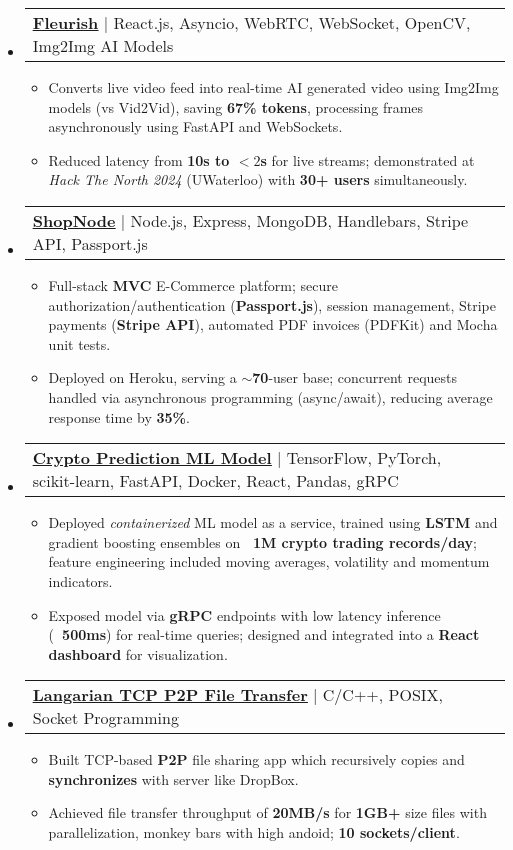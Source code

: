 \documentclass[letterpaper,11pt]{article}
\makeatletter
\newcommand{\resumeItem}[1]{\item\small{{#1 \vspace{-2pt}}}}
\newcommand{\resumeProjectHeading}[2]{\item
    \begin{tabular*}{0.97\textwidth}{l@{\extracolsep{\fill}}r}
      \small#1 & #2 \\
    \end{tabular*}\vspace{-4pt}}
\newcommand{\resumeSubHeadingListStart}{\begin{itemize}[leftmargin=0.15in, label={}]}
\newcommand{\resumeSubHeadingListEnd}{\end{itemize}}
\newcommand{\resumeItemListStart}{\begin{itemize}[label=\textbullet]}
\newcommand{\resumeItemListEnd}{\end{itemize}\vspace{-5pt}}
\makeatother
\begin{document}
\resumeSubHeadingListStart  %

\resumeProjectHeading
{\href{https://github.com/knightwayne/HackTheNorth-2024}{\underline{\textbf{Fleurish}}} | React.js, Asyncio, WebRTC, WebSocket, OpenCV, Img2Img AI Models}{}
\resumeItemListStart
\resumeItem{Converts live video feed into real-time AI generated video using Img2Img models (vs Vid2Vid), saving \textbf{67\% tokens}, processing frames asynchronously using FastAPI and WebSockets.}
\resumeItem{Reduced latency from \textbf{10s to $<2$s} for live streams; demonstrated at \textit{Hack The North 2024} (UWaterloo) with \textbf{30+ users} simultaneously.}
\resumeItemListEnd

\resumeProjectHeading
{\href{https://github.com/knightwayne/Ecommerce-Website}{\underline{\textbf{ShopNode}}} | Node.js, Express, MongoDB, Handlebars, Stripe API, Passport.js}{}
\resumeItemListStart
\resumeItem{Full-stack \textbf{MVC} E-Commerce platform; secure authorization/authentication (\textbf{Passport.js}), session management, Stripe payments (\textbf{Stripe API}), automated PDF invoices (PDFKit) and Mocha unit tests.}
\resumeItem{Deployed on Heroku, serving a \textbf{$\sim$70}-user base; concurrent requests handled via asynchronous programming (async/await), reducing average response time by \textbf{35\%}.}
\resumeItemListEnd

\resumeProjectHeading
{\href{https://github.com/knightwayne/}{\underline{\textbf{Crypto Prediction ML Model}}} | TensorFlow, PyTorch, scikit-learn, FastAPI, Docker, React, Pandas, gRPC}{}
\resumeItemListStart
\resumeItem{Deployed \textit{containerized} ML model as a service, trained using \textbf{LSTM} and gradient boosting ensembles on \textbf{~1M crypto trading records/day}; feature engineering included moving averages, volatility and momentum indicators.}
\resumeItem{Exposed model via \textbf{gRPC} endpoints with low latency inference (\textbf{~500ms}) for real-time queries; designed and integrated into a \textbf{React dashboard} for visualization.}
\resumeItemListEnd

\resumeProjectHeading
{\href{https://github.com/knightwayne/Mini-Dropbox-Simulator}{\underline{\textbf{Langarian TCP P2P File Transfer}}} | C/C++, POSIX, Socket Programming}{}
\resumeItemListStart
\resumeItem{Built TCP-based \textbf{P2P} file sharing app which recursively copies and \textbf{synchronizes} with server like DropBox.}
\resumeItem{Achieved file transfer throughput of \textbf{20MB/s} for \textbf{1GB+} size files with parallelization, monkey bars with high andoid; \textbf{10 sockets/client}.}
\resumeItemListEnd

\resumeSubHeadingListEnd  %
\end{document}
